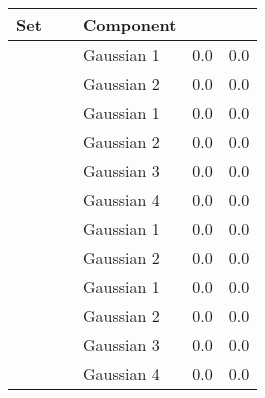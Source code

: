 
\begin{tabular}{@{}cclS[scientific-notation=true,round-mode=places,round-precision=1]S[scientific-notation=true,round-mode=places,round-precision=1]}
\toprule
Set 			&~					& Component		& {\mbe} 	& {\sambe}\\
\midrule
\hline
\ferdosiTwo 	&	& Gaussian 1	& 0.0 & 0.0\\
~ 				&	& Gaussian 2	& 0.0 & 0.0\\
\hline
\ferdosiThree	&	& Gaussian 1	& 0.0 & 0.0\\
~ 				&	& Gaussian 2	& 0.0 & 0.0\\
~ 				&	& Gaussian 3	& 0.0 & 0.0\\
~ 				&	& Gaussian 4	& 0.0 & 0.0\\
\hline
\baakmanTwo		&	& Gaussian 1	& 0.0 & 0.0\\
~ 				&	& Gaussian 2	& 0.0 & 0.0\\
\hline
\baakmanThree	&	& Gaussian 1 	& 0.0 & 0.0 \\
~ 				&	& Gaussian 2 	& 0.0 & 0.0 \\
~ 				&	& Gaussian 3 	& 0.0 & 0.0 \\
~ 				&	& Gaussian 4 	& 0.0 & 0.0 \\
\bottomrule
\end{tabular}